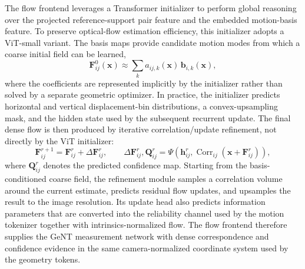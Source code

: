 The flow frontend leverages a Transformer initializer to perform global reasoning over the projected reference-support pair feature and the embedded motion-basis feature.
To preserve optical-flow estimation efficiency, this initializer adopts a ViT-small variant.
The basis maps provide candidate motion modes from which a coarse initial field can be learned,
\begin{equation}
    \bm{F}_{ij}^{0}(\bm{x})
    \approx
    \sum_{k} a_{ij,k}(\bm{x})\,\bm{b}_{i,k}(\bm{x}),
    \label{eq:geont_basis_flow_init}
\end{equation}
where the coefficients are represented implicitly by the initializer rather than solved by a separate geometric optimizer.
In practice, the initializer predicts horizontal and vertical displacement-bin distributions, a convex-upsampling mask, and the hidden state used by the subsequent recurrent update.
The final dense flow is then produced by iterative correlation/update refinement, not directly by the ViT initializer:
\begin{equation}
    \bm{F}_{ij}^{r+1}
    =
    \bm{F}_{ij}^{r}
    +
    \Delta\bm{F}_{ij}^{r},
    \qquad
    \Delta\bm{F}_{ij}^{r},\bm{Q}_{ij}^{r}
    =
    \Psi\!\left(\bm{h}_{ij}^{r},
    \operatorname{Corr}_{ij}(\bm{x}+\bm{F}_{ij}^{r})\right),
    \label{eq:geont_flow_refinement}
\end{equation}
where $\bm{Q}_{ij}^{r}$ denotes the predicted confidence map.
Starting from the basis-conditioned coarse field, the refinement module samples a correlation volume around the current estimate, predicts residual flow updates, and upsamples the result to the image resolution.
Its update head also predicts information parameters that are converted into the reliability channel used by the motion tokenizer together with intrinsics-normalized flow.
The flow frontend therefore supplies the GeNT measurement network with dense correspondence and confidence evidence in the same camera-normalized coordinate system used by the geometry tokens.

